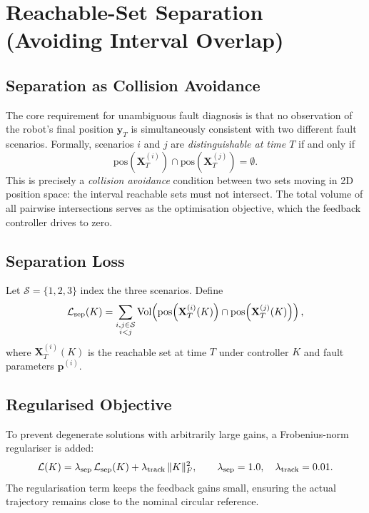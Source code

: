 \documentclass[11pt]{article}
\newcommand{\pvec}{\mathbf{p}}
\newcommand{\yvec}{\mathbf{y}}
\newcommand{\Xivl}{\mathbf{X}}
\newcommand{\Lsep}{\mathcal{L}_{\rm sep}}
\newcommand{\Ltotal}{\mathcal{L}}
\newcommand{\pos}{\mathrm{pos}}
\begin{document}
\section{Reachable-Set Separation (Avoiding Interval Overlap)}

\subsection{Separation as Collision Avoidance}

The core requirement for unambiguous fault diagnosis is that no observation
of the robot's final position $\yvec_T$ is simultaneously consistent with two
different fault scenarios. Formally, scenarios $i$ and $j$ are
\emph{distinguishable at time $T$} if and only if
\[
  \pos\!\left(\Xivl_T^{(i)}\right) \cap \pos\!\left(\Xivl_T^{(j)}\right)
  = \emptyset.
\]
This is precisely a \emph{collision avoidance} condition between two sets
moving in 2D position space: the interval reachable sets must not intersect.
The total volume of all pairwise intersections serves as the optimisation
objective, which the feedback controller drives to zero.

\subsection{Separation Loss}

Let $\mathcal{S} = \{1, 2, 3\}$ index the three scenarios. Define
\begin{equation}
  \label{eq:loss_sep}
  \Lsep(K) = \sum_{\substack{i,j \in \mathcal{S} \\ i < j}}
    \mathrm{Vol}\!\left(
      \pos\!\left(\Xivl_T^{(i)}(K)\right) \cap
      \pos\!\left(\Xivl_T^{(j)}(K)\right)
    \right),
\end{equation}
where $\Xivl_T^{(i)}(K)$ is the reachable set at time $T$ under controller
$K$ and fault parameters $\pvec^{(i)}$.

\subsection{Regularised Objective}

To prevent degenerate solutions with arbitrarily large gains, a Frobenius-norm
regulariser is added:
\begin{equation}
  \label{eq:loss_total}
  \Ltotal(K) = \lambda_{\rm sep}\,\Lsep(K)
             + \lambda_{\rm track}\,\|K\|_F^2,
  \qquad
  \lambda_{\rm sep} = 1.0,\quad
  \lambda_{\rm track} = 0.01.
\end{equation}
The regularisation term keeps the feedback gains small, ensuring the actual
trajectory remains close to the nominal circular reference.
\end{document}
